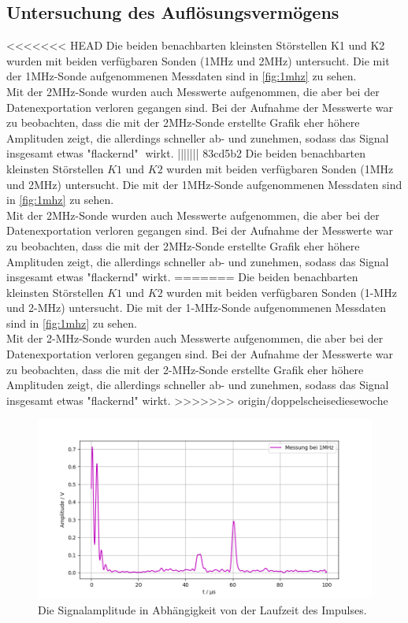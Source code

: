 \subsection{Untersuchung des Auflösungsvermögens}
<<<<<<< HEAD
Die beiden benachbarten kleinsten Störstellen K1 und K2 wurden mit beiden verfügbaren
Sonden (1MHz und 2MHz) untersucht. Die mit der 1MHz-Sonde aufgenommenen Messdaten sind in \autoref{fig:1mhz} zu sehen.\\
Mit der 2MHz-Sonde wurden auch Messwerte aufgenommen, die aber bei der Datenexportation verloren gegangen sind. 
Bei der Aufnahme der Messwerte war zu beobachten, dass die mit der 2MHz-Sonde erstellte Grafik eher höhere 
Amplituden zeigt, die allerdings schneller ab- und zunehmen, sodass das Signal insgesamt etwas "flackernd"  $\; $wirkt.
||||||| 83cd5b2
Die beiden benachbarten kleinsten Störstellen $K1$ und $K2$ wurden mit beiden verfügbaren
Sonden (1MHz und 2MHz) untersucht. Die mit der 1MHz-Sonde aufgenommenen Messdaten sind in \autoref{fig:1mhz} zu sehen.\\
Mit der 2MHz-Sonde wurden auch Messwerte aufgenommen, die aber bei der Datenexportation verloren gegangen sind. 
Bei der Aufnahme der Messwerte war zu beobachten, dass die mit der 2MHz-Sonde erstellte Grafik eher höhere 
Amplituden zeigt, die allerdings schneller ab- und zunehmen, sodass das Signal insgesamt etwas "flackernd"  wirkt.
=======
Die beiden benachbarten kleinsten Störstellen $K1$ und $K2$ wurden mit beiden verfügbaren
Sonden (1-MHz und 2-MHz) untersucht. Die mit der 1-MHz-Sonde aufgenommenen Messdaten sind in \autoref{fig:1mhz} zu sehen.\\
Mit der 2-MHz-Sonde wurden auch Messwerte aufgenommen, die aber bei der Datenexportation verloren gegangen sind. 
Bei der Aufnahme der Messwerte war zu beobachten, dass die mit der 2-MHz-Sonde erstellte Grafik eher höhere 
Amplituden zeigt, die allerdings schneller ab- und zunehmen, sodass das Signal insgesamt etwas "flackernd"  wirkt.
>>>>>>> origin/doppelscheisediesewoche
\begin{figure}[H]
  \centering
  \includegraphics[width = \textwidth]{content/1mhz_aufl_plot.png}
  \caption{Die Signalamplitude in Abhängigkeit von der Laufzeit des Impulses.}
  \label{fig:1mhz}
\end{figure}

